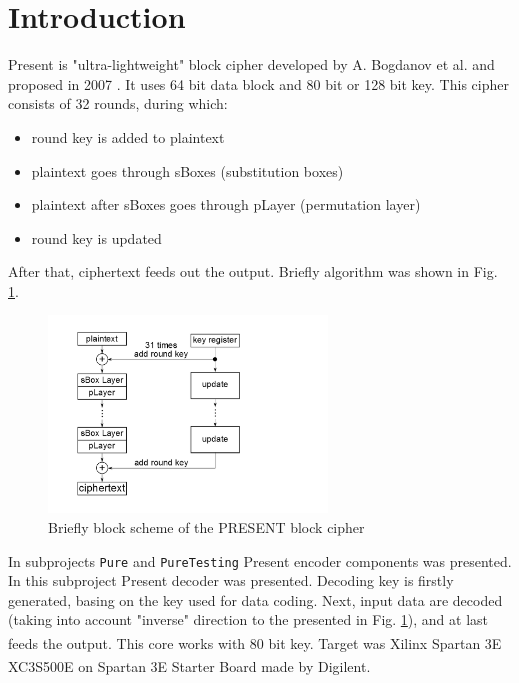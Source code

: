 \documentclass{gajewski}
\begin{document}
\maketitle

\newpage

\revisionTable

\newpage

\tableofcontents
\newpage

\section{Introduction}

Present is "ultra-lightweight" block cipher developed by A. Bogdanov et al. and proposed in 2007 \cite{PRESENT}. It uses 64 bit data block and 80 bit or 128 bit key.
This cipher consists of 32 rounds, during which: 
\begin{itemize}
    \item round key is added to plaintext
    \item plaintext goes through sBoxes (substitution boxes)
    \item plaintext after sBoxes goes through pLayer (permutation layer)
    \item round key is updated
\end{itemize}
After that, ciphertext feeds out the output. Briefly algorithm was shown in Fig. \ref{pAlgorithm}.
\begin{figure}[!ht]%
    \begin{center}
    \includegraphics[width=0.66\textwidth]{img/presentAlgorithm.png}
    \caption{%
        Briefly block scheme of the PRESENT block cipher
     }%
    \label{pAlgorithm}
    \end{center}
 \end{figure}
In subprojects \texttt{Pure} and \texttt{PureTesting} Present encoder components was presented. In this subproject Present decoder was presented. Decoding key is firstly generated, basing on the key used for data coding. Next, input data are decoded (taking into account "inverse" direction to the presented in Fig. \ref{pAlgorithm}), and at last feeds the output. This core works with 80 bit key. Target was Xilinx\textsuperscript{\textregistered} Spartan 3E XC3S500E \cite{Spartan} on Spartan 3E  Starter Board \cite{Digilent} made by Digilent\textsuperscript{\textregistered}.
\end{document}
